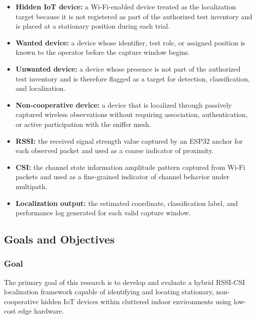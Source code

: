 \begin{itemize}
    \item \textbf{Hidden IoT device:} a Wi-Fi-enabled device treated as the localization target because it is not registered as part of the authorized test inventory and is placed at a stationary position during each trial.
    \item \textbf{Wanted device:} a device whose identifier, test role, or assigned position is known to the operator before the capture window begins.
    \item \textbf{Unwanted device:} a device whose presence is not part of the authorized test inventory and is therefore flagged as a target for detection, classification, and localization.
    \item \textbf{Non-cooperative device:} a device that is localized through passively captured wireless observations without requiring association, authentication, or active participation with the sniffer mesh.
    \item \textbf{RSSI:} the received signal strength value captured by an ESP32 anchor for each observed packet and used as a coarse indicator of proximity.
    \item \textbf{CSI:} the channel state information amplitude pattern captured from Wi-Fi packets and used as a fine-grained indicator of channel behavior under multipath.
    \item \textbf{Localization output:} the estimated coordinate, classification label, and performance log generated for each valid capture window.
\end{itemize}

\subsection{Goals and Objectives}
\subsubsection{Goal}
The primary goal of this research is to develop and evaluate a hybrid RSSI-CSI localization framework capable of identifying and locating stationary, non-cooperative hidden IoT devices within cluttered indoor environments using low-cost edge hardware.

